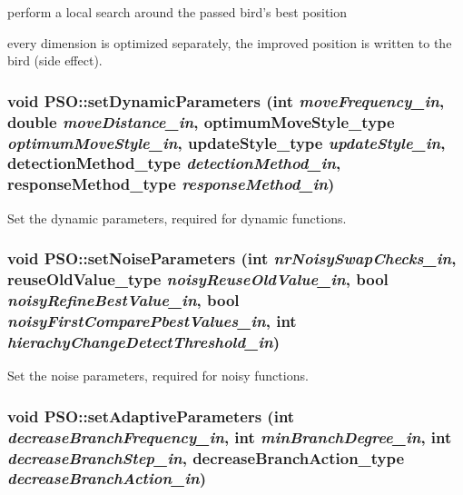perform a local search around the passed bird's best position 

every dimension is optimized separately, the improved position is written to the bird (side effect). \hypertarget{classPSO_ac1c7238fb77d452c197e4c16fe364bc}{
\subsubsection{\setlength{\rightskip}{0pt plus 5cm}void PSO::setDynamicParameters (int {\em moveFrequency\_\-in}, \/  double {\em moveDistance\_\-in}, \/  {\bf optimumMoveStyle\_\-type} {\em optimumMoveStyle\_\-in}, \/  {\bf updateStyle\_\-type} {\em updateStyle\_\-in}, \/  {\bf detectionMethod\_\-type} {\em detectionMethod\_\-in}, \/  {\bf responseMethod\_\-type} {\em responseMethod\_\-in})}}
\label{classPSO_ac1c7238fb77d452c197e4c16fe364bc}


Set the dynamic parameters, required for dynamic functions. 

\hypertarget{classPSO_c58c125453c245064c30b4dd04bf8d52}{
\subsubsection{\setlength{\rightskip}{0pt plus 5cm}void PSO::setNoiseParameters (int {\em nrNoisySwapChecks\_\-in}, \/  {\bf reuseOldValue\_\-type} {\em noisyReuseOldValue\_\-in}, \/  bool {\em noisyRefineBestValue\_\-in}, \/  bool {\em noisyFirstComparePbestValues\_\-in}, \/  int {\em hierachyChangeDetectThreshold\_\-in})}}
\label{classPSO_c58c125453c245064c30b4dd04bf8d52}


Set the noise parameters, required for noisy functions. 

\hypertarget{classPSO_1c88abec5f825f444bc0ad5f910ce639}{
\subsubsection{\setlength{\rightskip}{0pt plus 5cm}void PSO::setAdaptiveParameters (int {\em decreaseBranchFrequency\_\-in}, \/  int {\em minBranchDegree\_\-in}, \/  int {\em decreaseBranchStep\_\-in}, \/  {\bf decreaseBranchAction\_\-type} {\em decreaseBranchAction\_\-in})}}
\label{classPSO_1c88abec5f825f444bc0ad5f910ce639}


